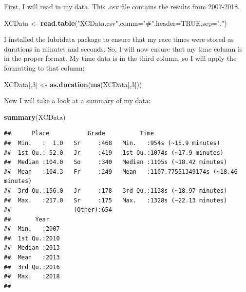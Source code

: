 \documentclass[
]{article}
\newenvironment{Shaded}{\begin{snugshade}}{\end{snugshade}}
\newcommand{\DataTypeTok}[1]{\textcolor[rgb]{0.13,0.29,0.53}{#1}}
\newcommand{\DecValTok}[1]{\textcolor[rgb]{0.00,0.00,0.81}{#1}}
\newcommand{\KeywordTok}[1]{\textcolor[rgb]{0.13,0.29,0.53}{\textbf{#1}}}
\newcommand{\NormalTok}[1]{#1}
\newcommand{\OtherTok}[1]{\textcolor[rgb]{0.56,0.35,0.01}{#1}}
\newcommand{\StringTok}[1]{\textcolor[rgb]{0.31,0.60,0.02}{#1}}
\begin{document}
First, I will read in my data. This .csv file contains the results from
2007-2018.

\begin{Shaded}
\begin{Highlighting}[]
\NormalTok{XCData <-}\StringTok{ }\KeywordTok{read.table}\NormalTok{(}\StringTok{"XCData.csv"}\NormalTok{,}\DataTypeTok{comm=}\StringTok{"#"}\NormalTok{,}\DataTypeTok{header=}\OtherTok{TRUE}\NormalTok{,}\DataTypeTok{sep=}\StringTok{","}\NormalTok{)}
\end{Highlighting}
\end{Shaded}

I installed the lubridata package to ensure that my race times were
stored as durations in minutes and seconds. So, I will now ensure that
my time column is in the proper format. My time data is in the third
column, so I will apply the formatting to that column:

\begin{Shaded}
\begin{Highlighting}[]
\NormalTok{XCData[,}\DecValTok{3}\NormalTok{] <-}\StringTok{ }\KeywordTok{as.duration}\NormalTok{(}\KeywordTok{ms}\NormalTok{(XCData[,}\DecValTok{3}\NormalTok{]))}
\end{Highlighting}
\end{Shaded}

Now I will take a look at a summary of my data:

\begin{Shaded}
\begin{Highlighting}[]
\KeywordTok{summary}\NormalTok{(XCData)}
\end{Highlighting}
\end{Shaded}

\begin{verbatim}
##      Place           Grade          Time                                   
##  Min.   :  1.0   Sr     :468   Min.   :954s (~15.9 minutes)                
##  1st Qu.: 52.0   Jr     :419   1st Qu.:1074s (~17.9 minutes)               
##  Median :104.0   So     :340   Median :1105s (~18.42 minutes)              
##  Mean   :104.3   Fr     :249   Mean   :1107.77551349174s (~18.46 minutes)  
##  3rd Qu.:156.0   Jr     :178   3rd Qu.:1138s (~18.97 minutes)              
##  Max.   :217.0   Sr     :175   Max.   :1328s (~22.13 minutes)              
##                  (Other):654                                               
##       Year     
##  Min.   :2007  
##  1st Qu.:2010  
##  Median :2013  
##  Mean   :2013  
##  3rd Qu.:2016  
##  Max.   :2018  
## 
\end{verbatim}
\end{document}
